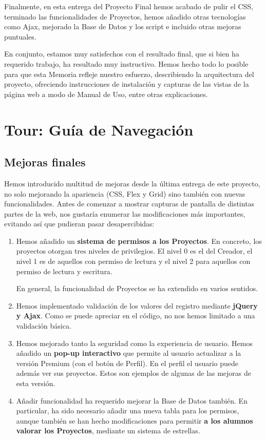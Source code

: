 \documentclass[12pt]{report}
\begin{document}
Finalmente, en esta entrega del Proyecto Final hemos acabado de pulir el CSS, terminado las funcionalidades de Proyectos, hemos añadido otras tecnologías como Ajax, mejorado la Base de Datos y los script e incluido otras mejoras puntuales.

En conjunto, estamos muy satisfechos con el resultado final, que si bien ha requerido trabajo, ha resultado muy instructivo. Hemos hecho todo lo posible para que esta Memoria refleje nuestro esfuerzo, describiendo la arquitectura del proyecto, ofreciendo instrucciones de instalación y capturas de las vistas de la página web a modo de Manual de Uso, entre otras explicaciones. 

\section{Tour: Guía de Navegación}
\subsection{Mejoras finales}
Hemos introducido multitud de mejoras desde la última entrega de este proyecto, no solo mejorando la apariencia (CSS, Flex y Grid) sino también con nuevas funcionalidades. Antes de comenzar a mostrar capturas de pantalla de distintas partes de la web, nos gustaría enumerar las modificaciones más importantes, evitando así que pudieran pasar desapercibidas:
\begin{enumerate}
    \item Hemos añadido un \textbf{sistema de permisos a los Proyectos}. En concreto, los proyectos otorgan tres niveles de privilegios. El nivel 0 es el del Creador, el nivel 1 es de aquellos con permiso de lectura y el nivel 2 para aquellos con permiso de lectura y escritura.
    
    En general, la funcionalidad de Proyectos se ha extendido en varios sentidos.
    
    \item Hemos implementado validación de los valores del registro mediante \textbf{jQuery y Ajax}. Como se puede apreciar en el código, no nos hemos limitado a una validación básica.
    
    \item Hemos mejorado tanto la seguridad como la experiencia de usuario. Hemos añadido un \textbf{pop-up interactivo} que permite al usuario actualizar a la versión Premium (con el botón de Perfil). En el perfil el usuario puede además ver sus proyectos. Estos son ejemplos de algunas de las mejoras de esta versión.
    
    \item Añadir funcionalidad ha requerido mejorar la Base de Datos también. En particular, ha sido necesario añadir una nueva tabla para los permisos, aunque también se han hecho modificaciones para permitir \textbf{a los alumnos valorar los Proyectos}, mediante un sistema de estrellas.
\end{enumerate}
\end{document}
